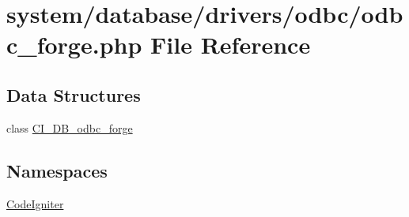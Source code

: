 \hypertarget{odbc__forge_8php}{}\section{system/database/drivers/odbc/odbc\+\_\+forge.php File Reference}
\label{odbc__forge_8php}
\subsection*{Data Structures}
\begin{DoxyCompactItemize}
\item 
class \mbox{\hyperlink{class_c_i___d_b__odbc__forge}{C\+I\+\_\+\+D\+B\+\_\+odbc\+\_\+forge}}
\end{DoxyCompactItemize}
\subsection*{Namespaces}
\begin{DoxyCompactItemize}
\item 
 \mbox{\hyperlink{namespace_code_igniter}{Code\+Igniter}}
\end{DoxyCompactItemize}
